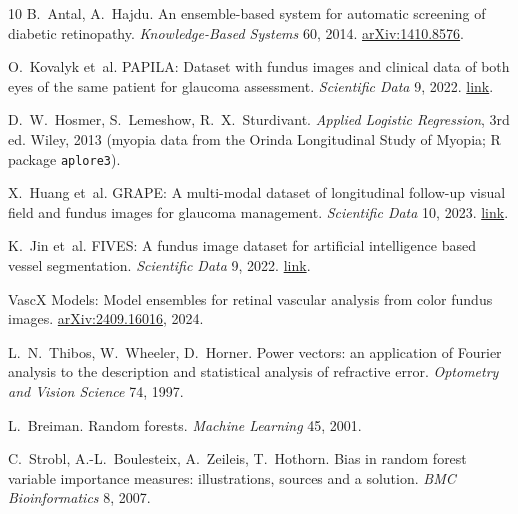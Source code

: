 \documentclass[11pt]{article}
\begin{document}

\begin{thebibliography}{10}\small
{}
B.~Antal, A.~Hajdu. An ensemble-based system for automatic screening of diabetic retinopathy.
\emph{Knowledge-Based Systems} 60, 2014. \href{https://arxiv.org/abs/1410.8576}{arXiv:1410.8576}.

O.~Kovalyk et~al. PAPILA: Dataset with fundus images and clinical data of both eyes of the same patient for
glaucoma assessment. \emph{Scientific Data} 9, 2022.
\href{https://www.nature.com/articles/s41597-022-01388-1}{link}.

D.~W.~Hosmer, S.~Lemeshow, R.~X.~Sturdivant. \emph{Applied Logistic Regression}, 3rd ed. Wiley, 2013
(myopia data from the Orinda Longitudinal Study of Myopia; R package \texttt{aplore3}).

X.~Huang et~al. GRAPE: A multi-modal dataset of longitudinal follow-up visual field and fundus images for
glaucoma management. \emph{Scientific Data} 10, 2023.
\href{https://www.nature.com/articles/s41597-023-02424-4}{link}.

K.~Jin et~al. FIVES: A fundus image dataset for artificial intelligence based vessel segmentation.
\emph{Scientific Data} 9, 2022. \href{https://www.ncbi.nlm.nih.gov/pmc/articles/PMC9352679/}{link}.

VascX Models: Model ensembles for retinal vascular analysis from color fundus images.
\href{https://arxiv.org/abs/2409.16016}{arXiv:2409.16016}, 2024.

L.~N.~Thibos, W.~Wheeler, D.~Horner. Power vectors: an application of Fourier analysis to the description and
statistical analysis of refractive error. \emph{Optometry and Vision Science} 74, 1997.

L.~Breiman. Random forests. \emph{Machine Learning} 45, 2001.

C.~Strobl, A.-L.~Boulesteix, A.~Zeileis, T.~Hothorn. Bias in random forest variable importance measures:
illustrations, sources and a solution. \emph{BMC Bioinformatics} 8, 2007.
\end{thebibliography}
\end{document}
